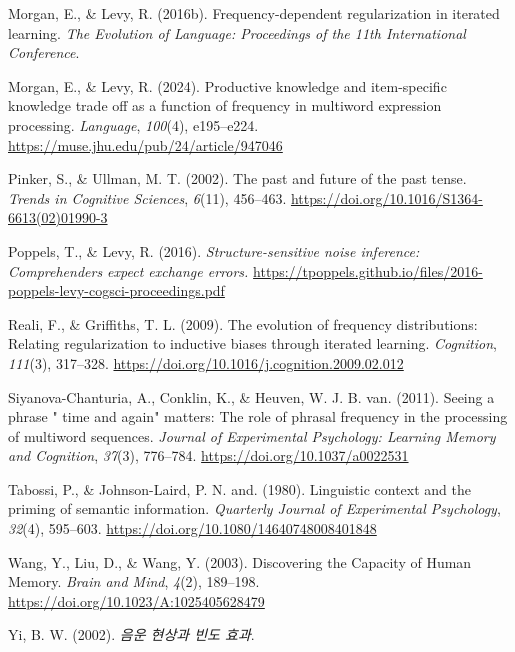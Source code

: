 \documentclass[
  12pt,
]{scrartcl}
\newlength{\cslhangindent}
\newenvironment{CSLReferences}[2] %
 {\begin{list}{}{%
  \setlength{\itemindent}{0pt}
  \setlength{\leftmargin}{0pt}
  \setlength{\parsep}{0pt}
  \ifodd #1
   \setlength{\leftmargin}{\cslhangindent}
   \setlength{\itemindent}{-1\cslhangindent}
  \fi
  \setlength{\itemsep}{#2\baselineskip}}}
 {\end{list}}
\begin{document}
\begin{CSLReferences}{1}{0}
Morgan, E., \& Levy, R. (2016b). Frequency-dependent regularization in
iterated learning. \emph{The Evolution of Language: Proceedings of the
11th International Conference}.

Morgan, E., \& Levy, R. (2024). Productive knowledge and item-specific
knowledge trade off as a function of frequency in multiword expression
processing. \emph{Language}, \emph{100}(4), e195--e224.
\url{https://muse.jhu.edu/pub/24/article/947046}

Pinker, S., \& Ullman, M. T. (2002). The past and future of the past
tense. \emph{Trends in Cognitive Sciences}, \emph{6}(11), 456--463.
\url{https://doi.org/10.1016/S1364-6613(02)01990-3}

Poppels, T., \& Levy, R. (2016). \emph{Structure-sensitive noise
inference: Comprehenders expect exchange errors.}
\url{https://tpoppels.github.io/files/2016-poppels-levy-cogsci-proceedings.pdf}

Reali, F., \& Griffiths, T. L. (2009). The evolution of frequency
distributions: Relating regularization to inductive biases through
iterated learning. \emph{Cognition}, \emph{111}(3), 317--328.
\url{https://doi.org/10.1016/j.cognition.2009.02.012}

Siyanova-Chanturia, A., Conklin, K., \& Heuven, W. J. B. van. (2011).
Seeing a phrase {"} time and again{"} matters: The role of phrasal
frequency in the processing of multiword sequences. \emph{Journal of
Experimental Psychology: Learning Memory and Cognition}, \emph{37}(3),
776--784. \url{https://doi.org/10.1037/a0022531}

Tabossi, P., \& Johnson-Laird, P. N. and. (1980). Linguistic context and
the priming of semantic information. \emph{Quarterly Journal of
Experimental Psychology}, \emph{32}(4), 595--603.
\url{https://doi.org/10.1080/14640748008401848}

Wang, Y., Liu, D., \& Wang, Y. (2003). Discovering the Capacity of Human
Memory. \emph{Brain and Mind}, \emph{4}(2), 189--198.
\url{https://doi.org/10.1023/A:1025405628479}

Yi, B. W. (2002). \emph{음운 현상과 빈도 효과}.

\end{CSLReferences}
\end{document}
